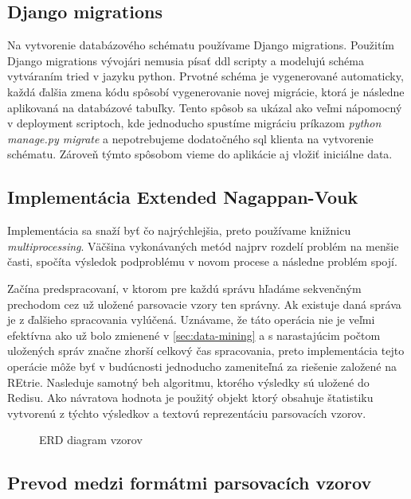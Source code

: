 \subsection*{Django migrations}
Na vytvorenie databázového schématu používame Django migrations. Použitím Django migrations vývojári nemusia písať ddl scripty a modelujú schéma vytváraním tried v jazyku python. Prvotné schéma je vygenerované automaticky, každá ďalšia zmena kódu spôsobí vygenerovanie novej migrácie, ktorá je následne aplikovaná na databázové tabuľky. Tento spôsob sa ukázal ako veľmi nápomocný v deployment scriptoch, kde jednoducho spustíme migráciu príkazom \emph{python manage.py migrate} a nepotrebujeme dodatočného sql klienta na vytvorenie schématu. Zároveň týmto spôsobom vieme do aplikácie aj vložiť iniciálne data.

\subsection{Implementácia Extended Nagappan-Vouk}
Implementácia sa snaží byť čo najrýchlejšia, preto používame knižnicu \emph{multiprocessing}. Väčšina vykonávaných metód najprv rozdelí problém na menšie časti, spočíta výsledok podproblému v novom procese a následne problém spojí. 
\par  Začína predspracovaní, v ktorom pre každú správu hľadáme sekvenčným prechodom cez už uložené parsovacie vzory ten správny. Ak existuje daná správa je z ďalšieho spracovania vylúčená. Uznávame, že táto operácia nie je veľmi efektívna ako už bolo zmienené v \ref{sec:data-mining} a s narastajúcim počtom uložených správ značne zhorší celkový čas spracovania, preto implementácia tejto operácie môže byť v budúcnosti  jednoducho zameniteľná za riešenie založené na REtrie. Nasleduje samotný beh algoritmu, ktorého výsledky sú uložené do Redisu. Ako návratova hodnota je použitý objekt ktorý obsahuje štatistiku vytvorenú z týchto výsledkov a textovú reprezentáciu parsovacích vzorov.

\begin{figure}[htbp]
 \centering 
 \begin{minipage}{0.95\linewidth}
 	\centering
 \end{minipage}
  \caption{ERD diagram vzorov}
  \label{fig:erd-patterns}
\end{figure}

\subsection{Prevod medzi formátmi parsovacích vzorov}
\label{sec:format-transformation}

